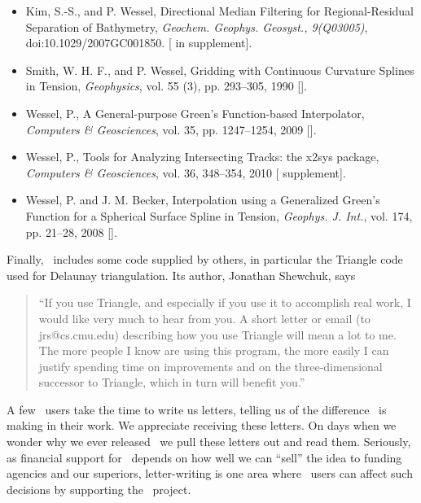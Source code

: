 \begin{itemize}

\item Kim, S.-S., and P. Wessel, Directional Median Filtering for Regional-Residual
Separation of Bathymetry, \emph{Geochem. Geophys. Geosyst., 9(Q03005)}, doi:10.1029/2007GC001850.
[ in  supplement].

\item Smith, W. H. F., and P. Wessel, Gridding with Continuous
Curvature Splines in Tension, \emph{Geophysics}, vol. 55 (3), pp.
293--305, 1990 [].

\item Wessel, P., A General-purpose Green's Function-based Interpolator,
\emph{Computers \& Geosciences}, vol. 35, pp. 1247--1254, 2009  [].

\item  Wessel, P., Tools for Analyzing Intersecting Tracks: the x2sys package,
\emph{Computers \& Geosciences}, vol. 36, 348--354, 2010  [ supplement].

\item Wessel, P. and J. M. Becker, Interpolation using a Generalized
Green's Function for a Spherical Surface Spline in Tension,
\emph{Geophys. J. Int.}, vol. 174, pp. 21--28, 2008  [].

\end{itemize}

\noindent
Finally, \GMT\ includes some code supplied by others, in particular the Triangle code
used for Delaunay triangulation.  Its author, Jonathan Shewchuk, says
\begin{quote}
``If you use Triangle, and especially if you use it to accomplish real
work, I would like very much to hear from you.  A short letter or email
(to jrs@cs.cmu.edu) describing how you use Triangle will mean a lot to
me.  The more people I know are using this program, the more easily I can
justify spending time on improvements and on the three-dimensional
successor to Triangle, which in turn will benefit you.''
\end{quote}

A few \GMT\ users take the time to write us letters, telling us of the
difference \GMT\ is making in their work.  We appreciate receiving these
letters.  On days when we wonder why we ever released \GMT\ we pull
these letters out and read them.  Seriously, as financial support for
\GMT\ depends on how well we can ``sell'' the idea to funding agencies and
our superiors, letter-writing is one area where \GMT\ users can affect
such decisions by supporting the \GMT\ project. 

